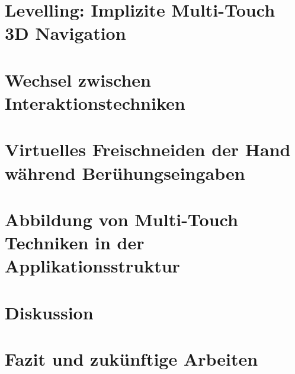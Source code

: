 \documentclass[pdftex,12pt,a4paper]{report}
\begin{document}

\chapter{Levelling: Implizite Multi-Touch 3D Navigation}
\label{chp:implizite_navigation}



\chapter{Wechsel zwischen Interaktionstechniken}
\label{chp:wechsel_zwischen_interaktionstechniken}



\chapter{Virtuelles Freischneiden der Hand während Berühungseingaben}
\label{chp:freischneiden}



\chapter{Abbildung von Multi-Touch Techniken in der Applikationsstruktur}
\label{chp:applikationsstruktur}



\chapter{Diskussion}
\label{chp:diskussion}



\chapter{Fazit und zukünftige Arbeiten}
\label{chp:fazit}



\end{document}
